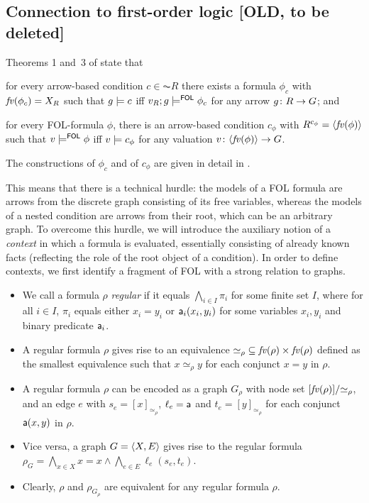 \subsection{Connection to first-order logic [OLD, to be deleted]}
Theorems 1 and~3 of \cite{Rensink-FOL} state that
\begin{enumerate*}[label=\emph{(\roman*)}]
\item for every arrow-based condition $c\in \AC R$ there exists a formula $\phi_c$ with $\mathit{fv}(\phi_c)=X_R$ such that $g\models c$ iff $v_R;g\models^{\mathsf{FOL}} \phi_c$ for any arrow $g\colon R\rightarrow G$; and

\item for every FOL-formula $\phi$, there is an arrow-based condition $c_\phi$ with $R^{c_\phi}=\langle \mathit{fv}(\phi) \rangle$ such that $v\models^{\mathsf{FOL}} \phi$ iff $v\models c_\phi$ for any valuation $v\colon \langle \mathit{fv}(\phi) \rangle\rightarrow G$.
\end{enumerate*}
The constructions of $\phi_c$ and of $c_\phi$ are given in detail in \cite{Rensink-FOL}.

\iffull
{}
This means that there is a technical hurdle: the models of a FOL formula are arrows from the discrete graph consisting of its free variables, whereas the models of a nested condition are arrows from their root, which can be an arbitrary graph. To overcome this hurdle, we will introduce the auxiliary notion of a \emph{context} in which a formula is evaluated, essentially consisting of already known facts (reflecting the role of the root object of a condition). In order to define contexts, we first identify a fragment of FOL with a strong relation to graphs.

\begin{itemize}
\item We call a formula $\rho$ \emph{regular} if it equals $\bigwedge_{i\in I} \pi_i$ for some finite set $I$, where for all $i\in I$, $\pi_i$ equals either $x_i=y_i$ or $\mathsf{a}_i(x_i,y_i)$ for some variables $x_i,y_i$ and binary predicate $\mathsf{a}_i$.

\item A regular formula $\rho$ gives rise to an equivalence ${\simeq_\rho}\subseteq \mathit{fv}(\rho)\times \mathit{fv}(\rho)$ defined as the smallest equivalence such that $x\simeq_\rho y$ for each conjunct $x=y$ in $\rho$.

\item A regular formula $\rho$ can be encoded as a graph $G_\rho$ with node set $[\mathit{fv}(\rho)]/{\simeq_\rho}$, and an edge $e$ with $s_e=[x]_{\simeq_\rho}$, $\ell_e=\mathsf{a}$ and $t_e=[y]_{\simeq_\rho}$ for each conjunct $\mathsf{a}(x,y)$ in $\rho$.

\item Vice versa, a graph $G=\langle{X,E}\rangle$ gives rise to the regular formula $\rho_G=\bigwedge_{x\in X} x=x \wedge \bigwedge_{e\in E} \ell_e(s_e,t_e)$.

\item Clearly, $\rho$ and $\rho_{G_\rho}$ are equivalent for any regular formula $\rho$.
\end{itemize}




